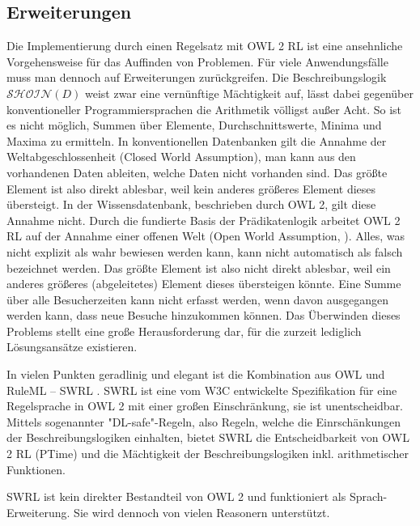 \documentclass[runningheads,a4paper]{llncs}
\begin{document}


\subsection{Erweiterungen}
\label{sec:rule_extensions}

Die Implementierung durch einen Regelsatz mit OWL 2 RL \cite{owl2rl} ist eine ansehnliche Vorgehensweise für das Auffinden von Problemen. 
Für viele Anwendungsfälle muss man dennoch auf Erweiterungen zurückgreifen. 
Die Beschreibungslogik \(\mathcal{SHOIN}(D)\) weist zwar eine vernünftige Mächtigkeit auf, lässt dabei gegenüber konventioneller Programmiersprachen die Arithmetik völligst außer Acht. 
So ist es nicht möglich, Summen über Elemente, Durchschnittswerte, Minima und Maxima zu ermitteln. 
In konventionellen Datenbanken gilt die Annahme der Weltabgeschlossenheit (Closed World Assumption), man kann aus den vorhandenen Daten ableiten, welche Daten nicht vorhanden sind. 
Das größte Element ist also direkt ablesbar, weil kein anderes größeres Element dieses übersteigt. 
In der Wissensdatenbank, beschrieben durch OWL 2, gilt diese Annahme nicht. 
Durch die fundierte Basis der Prädikatenlogik arbeitet OWL 2 RL auf der Annahme einer offenen Welt (Open World Assumption, \cite[p. 194]{foundations}). 
Alles, was nicht explizit als wahr bewiesen werden kann, kann nicht automatisch als falsch bezeichnet werden. 
Das größte Element ist also nicht direkt ablesbar, weil ein anderes größeres (abgeleitetes) Element dieses übersteigen könnte. 
Eine Summe über alle Besucherzeiten kann nicht erfasst werden, wenn davon ausgegangen werden kann, dass neue Besuche hinzukommen können.
Das Überwinden dieses Problems stellt eine große Herausforderung dar, für die zurzeit lediglich Lösungsansätze existieren. 

In vielen Punkten geradlinig und elegant ist die Kombination aus OWL und RuleML -- SWRL \cite{swrl}. 
SWRL ist eine vom W3C entwickelte Spezifikation für eine Regelsprache in OWL 2 \cite{owl2} mit einer großen Einschränkung, sie ist unentscheidbar. 
Mittels sogenannter "{}DL-safe"{}-Regeln, also Regeln, welche die Einrschänkungen der Beschreibungslogiken einhalten, bietet SWRL die Entscheidbarkeit von OWL 2 RL (PTime) und die Mächtigkeit der Beschreibungslogiken inkl. arithmetischer Funktionen. 

SWRL ist kein direkter Bestandteil von OWL 2 und funktioniert als Sprach-Erweiterung. 
Sie wird dennoch von vielen Reasonern unterstützt.
\end{document}
